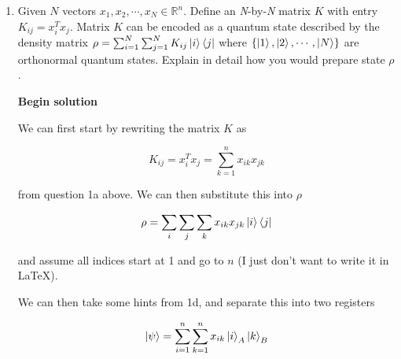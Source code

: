 \documentclass[11pt]{article}
\begin{document}
\begin{enumerate}
\begin{enumerate}
		            The squared norm of the data state

		            \begin{equation*}
			            P(0) = \frac12 (1 + \text{Re}\braket{0|U_x^{\dagger} U_y|0}) = \frac12 (1 + \text{Re}\braket{x|y})
		            \end{equation*}

		            Since $\braket{x|y}$ is already real, Re changes nothing.


		            The circuit is then repeated $N$ times to estimate $P(0)$. The ancilla is measured in the computational basis and $P(0) \approx N_0/N$. The sign is measured to be positive if $P(0) > 1/2$ and negative if $P(0) < 1/2$. If $P(0) = 1/2$ it means $\braket{x|y} = 0$. One thing to note: the closer $\braket{x|y}$ is to 0, the larger N must be to tell the two sides apart.

	      \end{enumerate}

	\item Given $N$ vectors $x_1, x_2, \cdots, x_N \in \mathbb{R}^n$. Define an \textit{N}-by-\textit{N} matrix $K$ with entry $K_{ij} = x_i^Tx_j$. Matrix $K$ can be encoded as a quantum state described by the density matrix $\rho = \sum_{i=1}^N \sum_{j=1}^N K_{ij} \ket{i} \bra{j}$ where $\{ \ket{1}, \ket{2}, \cdots, \ket{N} \}$ are orthonormal quantum states. Explain in detail how you would prepare state $\rho$.

	      \textbf{Begin solution}

	      We can first start by rewriting the matrix $K$ as

	      \begin{equation*}
		      K_{ij} = x_i^T x_j = \sum_{k=1}^n x_{ik} x_{jk}
	      \end{equation*}

	      from question 1a above. We can then substitute this into $\rho$

	      \begin{equation*}
		      \rho = \sum_i \sum_j \sum_k x_{ik} x_{jk} \ket{i} \bra{j}
	      \end{equation*}

	      and assume all indices start at 1 and go to $n$ (I just don't want to write it in LaTeX).

	      We can then take some hints from 1d, and separate this into two registers

	      \begin{equation*}
		      \ket{\psi} = \sum_{i=1}^n \sum_{k=1}^n x_{ik} \ket{i}_A \ket{k}_B
	      \end{equation*}


\end{enumerate}
\end{document}
